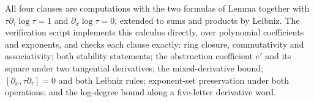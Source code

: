 All four clauses are computations with the two formulas of Lemma  together with $\tau\partial_\tau \log\tau = 1$ and $\partial_x\log\tau = 0$, extended to sums and products by Leibniz. The verification script implements this calculus directly, over polynomial coefficients and exponents, and checks each clause exactly: ring closure, commutativity and associativity; both stability statements; the obstruction coefficient $e'$ and its square under two tangential derivatives; the mixed-derivative bound; $[\partial_x, \tau\partial_\tau]=0$ and both Leibniz rules; exponent-set preservation under both operations; and the log-degree bound along a five-letter derivative word.
